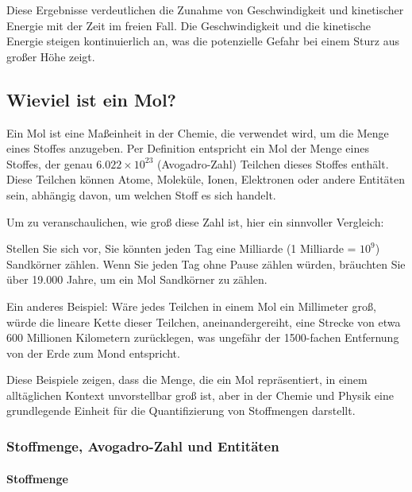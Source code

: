 \documentclass{vorlage-design-main}
\begin{document}
Diese Ergebnisse verdeutlichen die Zunahme von Geschwindigkeit und
kinetischer Energie mit der Zeit im freien Fall. Die Geschwindigkeit und
die kinetische Energie steigen kontinuierlich an, was die potenzielle
Gefahr bei einem Sturz aus großer Höhe zeigt.

\hypertarget{wieviel-ist-ein-mol}{%
\subsection{Wieviel ist ein Mol?}\label{wieviel-ist-ein-mol}}

Ein Mol ist eine Maßeinheit in der Chemie, die verwendet wird, um die
Menge eines Stoffes anzugeben. Per Definition entspricht ein Mol der
Menge eines Stoffes, der genau $6.022 \times 10^{23}$ (Avogadro-Zahl)
Teilchen dieses Stoffes enthält. Diese Teilchen können Atome, Moleküle,
Ionen, Elektronen oder andere Entitäten sein, abhängig davon, um welchen
Stoff es sich handelt.

Um zu veranschaulichen, wie groß diese Zahl ist, hier ein sinnvoller
Vergleich:

Stellen Sie sich vor, Sie könnten jeden Tag eine Milliarde (1 Milliarde
= $10^9$) Sandkörner zählen. Wenn Sie jeden Tag ohne Pause zählen
würden, bräuchten Sie über 19.000 Jahre, um ein Mol Sandkörner zu
zählen.

Ein anderes Beispiel: Wäre jedes Teilchen in einem Mol ein Millimeter
groß, würde die lineare Kette dieser Teilchen, aneinandergereiht, eine
Strecke von etwa 600 Millionen Kilometern zurücklegen, was ungefähr der
1500-fachen Entfernung von der Erde zum Mond entspricht.

Diese Beispiele zeigen, dass die Menge, die ein Mol repräsentiert, in
einem alltäglichen Kontext unvorstellbar groß ist, aber in der Chemie
und Physik eine grundlegende Einheit für die Quantifizierung von
Stoffmengen darstellt.

\hypertarget{stoffmenge-avogadro-zahl-und-entituxe4ten}{%
\subsubsection{Stoffmenge, Avogadro-Zahl und
Entitäten}\label{stoffmenge-avogadro-zahl-und-entitaeten}}

\hypertarget{stoffmenge}{%
\paragraph{Stoffmenge}\label{stoffmenge}}
\end{document}
